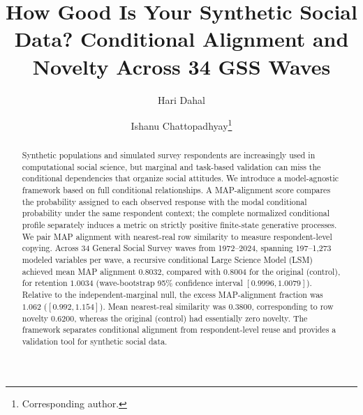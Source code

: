 \documentclass[runningheads]{llncs}
\begin{document}
\raggedbottom
\setlength{\textfloatsep}{12pt plus 2pt minus 2pt}
\setlength{\intextsep}{10pt plus 2pt minus 2pt}
\mainmatter

\title{How Good Is Your Synthetic Social Data? Conditional Alignment and Novelty Across 34 GSS Waves}

\author{Hari Dahal \and Ishanu Chattopadhyay\thanks{Corresponding author.}}

\maketitle

\begin{abstract}
Synthetic populations and simulated survey respondents are increasingly used in
computational social science, but marginal and task-based validation can miss
the conditional dependencies that organize social attitudes. We introduce a
model-agnostic framework based on full conditional relationships. A
MAP-alignment score compares the probability assigned to each observed response
with the modal conditional probability under the same respondent context; the
complete normalized conditional profile separately induces a metric on strictly
positive finite-state generative processes. We pair MAP alignment with
nearest-real row similarity to measure respondent-level copying. Across 34
General Social Survey waves from 1972--2024, spanning 197--1,273 modeled
variables per wave, a recursive conditional Large Science Model (LSM) achieved
mean MAP alignment $0.8032$, compared with $0.8004$ for the original (control),
for retention $1.0034$ (wave-bootstrap 95\% confidence interval
$[0.9996,1.0079]$). Relative to the independent-marginal null, the excess
MAP-alignment fraction was $1.062$ ($[0.992,1.154]$). Mean nearest-real
similarity was $0.3800$, corresponding to row novelty $0.6200$, whereas the
original (control) had essentially zero novelty. The framework separates conditional alignment from respondent-level
reuse and provides a validation tool for synthetic social data.
\end{abstract}
\end{document}
